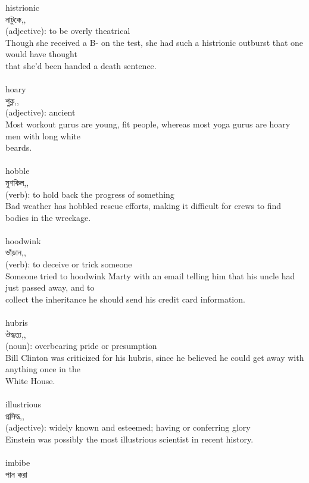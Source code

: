 \documentclass{article}
\begin{document}
{{histrionic}\\
{নাটুকে,,}\\
{(adjective): to be overly theatrical\\Though she received a B- on the test, she had such a histrionic outburst that one would have thought\\that she'd been handed a death sentence.\\}\\
{hoary}\\
{শুক্ল,,}\\
{(adjective): ancient\\Most workout gurus are young, fit people, whereas most yoga gurus are hoary men with long white\\beards.\\}\\
{hobble}\\
{মুশকিল,,}\\
{(verb): to hold back the progress of something\\Bad weather has hobbled rescue efforts, making it difficult for crews to find bodies in the wreckage.\\}\\
{hoodwink}\\
{ভাঁড়ান,,}\\
{(verb): to deceive or trick someone\\Someone tried to hoodwink Marty with an email telling him that his uncle had just passed away, and to\\collect the inheritance he should send his credit card information.\\}\\
{hubris}\\
{ঔদ্ধত্য,,}\\
{(noun): overbearing pride or presumption\\Bill Clinton was criticized for his hubris, since he believed he could get away with anything once in the\\White House.\\}\\
{illustrious}\\
{প্রসিদ্ধ,,}\\
{(adjective): widely known and esteemed; having or conferring glory\\Einstein was possibly the most illustrious scientist in recent history.\\}\\
{imbibe}\\
{পান করা}\\
}
\end{document}
